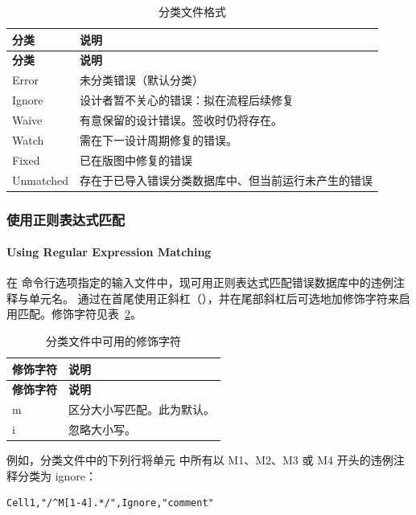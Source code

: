 \begin{longtable}{@{}>{\raggedright\arraybackslash\ttfamily}p{} p{}@{}}
\caption{分类文件格式}\label{tab:classify-format}\\
\toprule
\textbf{\textrm{分类}} & \textbf{\textrm{说明}} \\
\midrule
\endfirsthead
\toprule
\textbf{\textrm{分类}} & \textbf{\textrm{说明}} \\
\midrule
\endhead
\bottomrule
\endfoot
Error & 未分类错误（默认分类） \\
Ignore & 设计者暂不关心的错误：拟在流程后续修复 \\
Waive & 有意保留的设计错误。签收时仍将存在。 \\
Watch & 需在下一设计周期修复的错误。 \\
Fixed & 已在版图中修复的错误 \\
Unmatched & 存在于已导入错误分类数据库中、但当前运行未产生的错误 \\
\end{longtable}

\subsubsection{使用正则表达式匹配}
\paragraph*{Using Regular Expression Matching}

在  命令行选项指定的输入文件中，现可用正则表达式匹配错误数据库中的违例注释与单元名。
通过在首尾使用正斜杠（\cmd{/}），并在尾部斜杠后可选地加修饰字符来启用匹配。修饰字符见表~\ref{tab:classify-mod}。

\begin{longtable}{@{}>{\raggedright\arraybackslash\ttfamily}p{} p{}@{}}
\caption{分类文件中可用的修饰字符}\label{tab:classify-mod}\\
\toprule
\textbf{\textrm{修饰字符}} & \textbf{\textrm{说明}} \\
\midrule
\endfirsthead
\toprule
\textbf{\textrm{修饰字符}} & \textbf{\textrm{说明}} \\
\midrule
\endhead
\bottomrule
\endfoot
m & 区分大小写匹配。此为默认。 \\
i & 忽略大小写。 \\
\end{longtable}

例如，分类文件中的下列行将单元  中所有以 M1、M2、M3 或 M4 开头的违例注释分类为 ignore：
\begin{lstlisting}[style=shell]
Cell1,"/^M[1-4].*/",Ignore,"comment"
\end{lstlisting}

